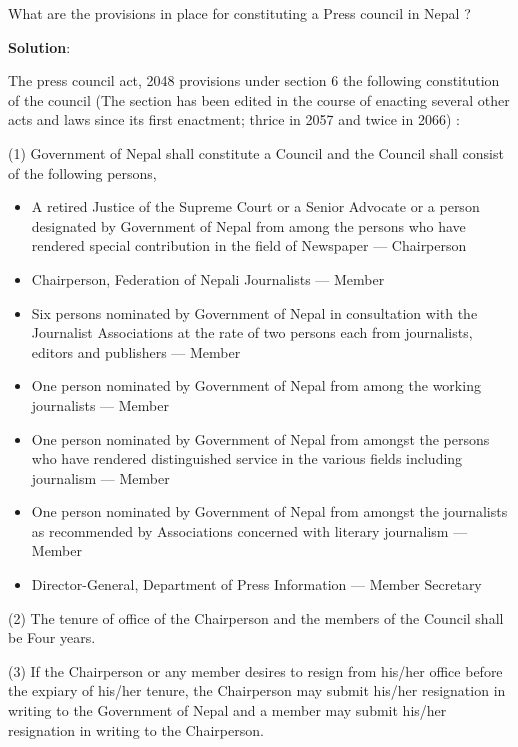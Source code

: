 \documentclass[
]{book}
\newcommand{\question}{\item}
\newenvironment{solution}{ {\bfseries Solution}:}{}
\begin{document}
\begin{questions}
\question What are the provisions in place for constituting a Press council in Nepal ?

\begin{solution}

The press council act, 2048 provisions under section 6 the following constitution of the council (The section has been edited in the course of enacting several other acts and laws since its first enactment; thrice in 2057 and twice in 2066) :

(1) Government of Nepal shall constitute a Council and the Council shall consist of the following persons,

\begin{itemize}
\item A retired Justice of the Supreme Court or a Senior Advocate or a person designated by Government of Nepal from among the persons who have rendered special contribution in the field of Newspaper --- Chairperson
\item Chairperson, Federation of Nepali Journalists --- Member
\item Six persons nominated by Government of Nepal in consultation with the Journalist Associations at the rate of two persons each from journalists, editors and publishers --- Member
\item One person nominated by Government of Nepal from among the working journalists --- Member
\item One person nominated by Government of Nepal from amongst the persons who have rendered distinguished service in the various fields including journalism --- Member
\item One person nominated by Government of Nepal from  amongst the journalists as recommended by Associations concerned with literary journalism --- Member
\item Director-General, Department of Press Information --- Member Secretary
\end{itemize}

(2) The tenure of office of the Chairperson and the members of the Council shall be Four years.

(3) If the Chairperson or any member desires to resign from his/her office before the expiary of his/her tenure, the Chairperson may submit his/her resignation in writing to the Government of Nepal and a member may submit his/her resignation in writing to the Chairperson.

\end{solution}

\end{questions}
\end{document}
